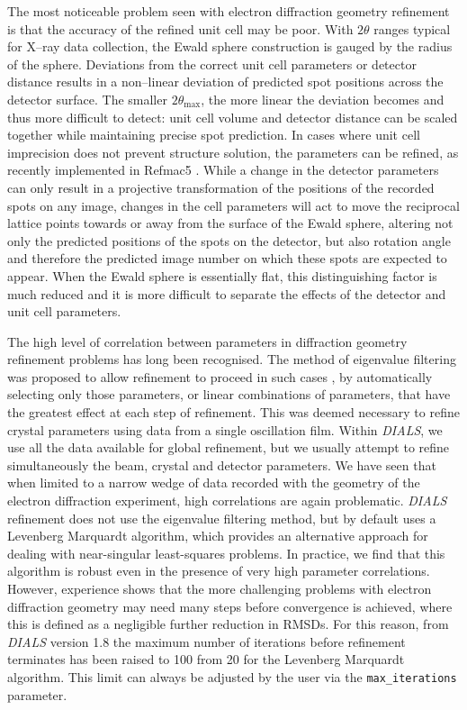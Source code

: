\documentclass[preprint]{iucr}
\newcommand{\dials}{\emph{DIALS}\xspace}
\newcommand{\code}{\texttt}
\newcounter{DWCounter}
\newcommand{\DW}[1]{%
   \stepcounter{DWCounter}%
   {\color{red}{\textbf{DW \#\arabic{DWCounter}: }#1}}%
  }
\begin{document}
The most noticeable problem seen with electron diffraction geometry refinement
is that the accuracy of the refined unit cell may be poor. With $2\theta$ ranges
typical for X--ray data collection, the Ewald sphere construction is gauged by
the radius of the sphere. Deviations from the correct unit cell parameters or
detector distance results in a non--linear deviation of predicted spot positions
across the detector surface. The smaller $2\theta_\text{max}$, the more linear
the deviation becomes and thus more difficult to detect: unit cell volume and
detector distance can be scaled together while maintaining precise spot prediction.
In cases where unit cell imprecision does not prevent structure solution, the
parameters can be refined, as recently implemented in Refmac5 \DW{Note to add a
citation}.  While a change in
the detector parameters can only result in a projective transformation of the
positions of the recorded spots on any image, changes in the cell parameters
will act to move the reciprocal lattice points towards or away from the surface
of the Ewald sphere, altering not only the predicted positions of the spots on
the detector, but also rotation angle and therefore the predicted image number
on which these spots are expected to appear. When the Ewald sphere is
essentially flat, this distinguishing factor is much reduced and it is more
difficult to separate the effects of the detector and unit cell parameters.

The high level of correlation between parameters in diffraction geometry
refinement problems has long been recognised. The method of eigenvalue
filtering was proposed to allow refinement to proceed in such cases
\cite{Reeke1984,LURE1986phase3}, by automatically selecting only those
parameters, or linear combinations of parameters, that have the greatest effect
at each step of refinement. This was deemed necessary to refine crystal
parameters using data from a single oscillation film. Within \dials, we use all
the data available for global refinement, but we usually attempt to refine
simultaneously the beam, crystal and detector parameters. We have seen that
when limited to a narrow wedge of data recorded with the geometry of the
electron diffraction experiment, high correlations are again problematic. \dials
refinement does not use the eigenvalue filtering method, but by default uses a
Levenberg Marquardt algorithm, which provides an alternative approach for
dealing with near-singular least-squares problems. In practice, we find that
this algorithm is robust even in the presence of very high parameter
correlations. However, experience shows that the more challenging problems with
electron diffraction geometry may need many steps before convergence is
achieved, where this is defined as a negligible further reduction in RMSDs. For
this reason, from \dials version 1.8 the maximum number of iterations before
refinement terminates has been raised to 100 from 20 for the Levenberg
Marquardt algorithm. This limit can always be adjusted by the user via the
\code{max\_iterations} parameter.
\end{document}

